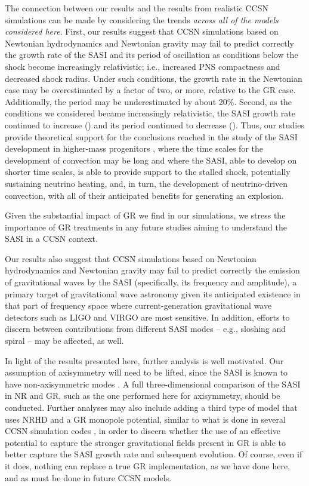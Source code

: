 The connection between our results and the results from realistic
CCSN simulations can be made by considering the trends \emph{across all of the
models considered here}.
First, our results suggest that CCSN simulations based on Newtonian
hydrodynamics and Newtonian gravity may fail to predict correctly the growth
rate of the SASI and its period of oscillation as conditions below the shock
become increasingly relativistic; i.e., increased PNS compactness
and decreased shock radius.
Under such conditions, the growth rate in the Newtonian case may be
overestimated by a factor of two, or more, relative to the GR
case.
Additionally, the period may be underestimated by about 20\%.
Second, as the conditions we considered became increasingly relativistic,
the SASI growth rate continued to increase () and its period continued to decrease ().
Thus, our studies provide theoretical support for the conclusions reached in
the study of the SASI development in higher-mass progenitors
\citep[see, e.g.,][]{hmw2013,mat2022}, where the time scales for the development
of convection may be long and where the SASI, able to develop on shorter time
scales, is able to provide support to the stalled shock,
potentially sustaining neutrino heating, and, in turn, the development of
neutrino-driven convection, with all of their anticipated benefits for
generating an explosion.

Given the substantial impact of GR we find in our simulations,
we stress the importance of GR treatments in any future studies
aiming to understand the SASI in a CCSN context.

Our results also suggest that CCSN simulations based on Newtonian hydrodynamics
and Newtonian gravity may fail to predict correctly the emission of
gravitational waves by the SASI (specifically, its frequency and amplitude),
a primary target of gravitational wave astronomy given its anticipated existence
in that part of frequency space where current-generation
gravitational wave detectors such as LIGO and VIRGO are most sensitive.
In addition, efforts to discern between contributions from different
SASI modes -- e.g., sloshing and spiral -- may be affected, as well.

In light of the results presented here, further analysis is well motivated.
Our assumption of axisymmetry will need to be lifted, since the SASI is known
to have non-axisymmetric modes \citep{bm2007,bs2007,f2010,f2015}.
A full three-dimensional comparison of the SASI in NR and GR, such as the one
performed here for axisymmetry, should be conducted.
Further analyses may also include adding a third type of model that uses
NRHD and a GR monopole potential,
similar to what is done in several CCSN simulation
codes \citep[e.g.,][]{rj2002,ktf2018,sdb2019,bbh2020},
in order to discern whether the use
of an effective potential to capture the stronger gravitational fields present
in GR is able to better capture the SASI growth rate and subsequent evolution.
Of course, even if it does, nothing can replace a true GR implementation,
as we have done here, and as must be done in future CCSN models.

